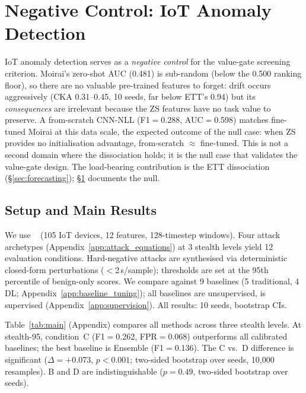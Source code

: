 \section{Negative Control: IoT Anomaly Detection}
\label{sec:iot}

IoT anomaly detection serves as a \emph{negative control} for the
value-gate screening criterion.  Moirai's zero-shot AUC (0.481) is sub-random
(below the 0.500 ranking floor), so there are no valuable pre-trained
features to forget: drift occurs aggressively (CKA 0.31--0.45, 10 seeds,
far below ETT's 0.94) but its \emph{consequences} are irrelevant
because the ZS features have no task value to preserve.  A from-scratch
CNN-NLL (F1$=$0.288, AUC$=$0.598) matches fine-tuned Moirai at this
data scale, the expected outcome of the null case: when ZS provides
no initialisation advantage, from-scratch $\approx$ fine-tuned.
This is not a second domain where the dissociation holds; it is the
null case that validates the value-gate design.
The load-bearing contribution is the ETT dissociation
(\S\ref{sec:forecasting}); \S\ref{sec:iot} documents the null.

\subsection{Setup and Main Results}
\label{sec:experiments:setup}

We use \dataset{}~\cite{neto2023ciciot} (105 IoT devices, 12 features,
128-timestep windows).  Four attack archetypes
(Appendix~\ref{app:attack_equations}) at 3 stealth levels yield 12
evaluation conditions.  Hard-negative attacks are synthesised via
deterministic closed-form perturbations ($<$2\,s/sample); thresholds
are set at the 95th percentile of benign-only scores.
We compare against 9 baselines (5 traditional, 4 DL;
Appendix~\ref{app:baseline_tuning}); all baselines are unsupervised,
\ours{} is supervised (Appendix~\ref{app:supervision}).
All results: 10 seeds, bootstrap CIs.

Table~\ref{tab:main} (Appendix) compares all methods across three stealth levels.
At stealth-95, \ours{} condition~C (F1$=$0.262, FPR$=$0.068) outperforms all
calibrated baselines; the best baseline is Ensemble (F1$=$0.136).
The C vs.\ D difference is significant
($\Delta{=}+$0.073, $p{<}0.001$; two-sided bootstrap over seeds,
10{,}000 resamples).
B and D are indistinguishable ($p{=}0.49$, two-sided bootstrap over seeds).

